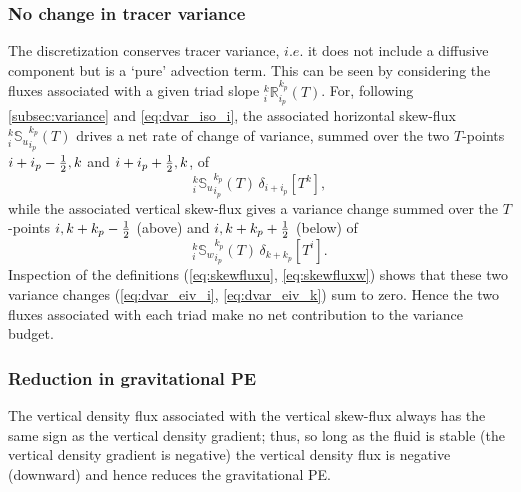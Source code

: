 \documentclass[../tex_main/NEMO_manual]{subfiles}
\begin{document}
\subsubsection{No change in tracer variance}
The discretization conserves tracer variance, $i.e.$ it does not
include a diffusive component but is a `pure' advection term. This can
be seen
by considering the
fluxes associated with a given triad slope
$_i^k{\mathbb{R}}_{i_p}^{k_p} (T)$. For, following
\autoref{subsec:variance} and \autoref{eq:dvar_iso_i}, the
associated horizontal skew-flux $_i^k{\mathbb{S}_u}_{i_p}^{k_p} (T)$
drives a net rate of change of variance, summed over the two
$T$-points $i+i_p-\textstyle\frac{1}{2},k$ and $i+i_p+\textstyle\frac{1}{2},k$, of
\begin{equation}
\label{eq:dvar_eiv_i}
  _i^k{\mathbb{S}_u}_{i_p}^{k_p} (T)\,\delta_{i+ i_p}[T^k],
\end{equation}
while the associated vertical skew-flux gives a variance change summed over the
$T$-points $i,k+k_p-\textstyle\frac{1}{2}$ (above) and $i,k+k_p+\textstyle\frac{1}{2}$ (below) of
\begin{equation}
\label{eq:dvar_eiv_k}
  _i^k{\mathbb{S}_w}_{i_p}^{k_p} (T) \,\delta_{k+ k_p}[T^i].
\end{equation}
Inspection of the definitions (\autoref{eq:skewfluxu}, \autoref{eq:skewfluxw})
shows that these two variance changes (\autoref{eq:dvar_eiv_i}, \autoref{eq:dvar_eiv_k})
sum to zero. Hence the two fluxes associated with each triad make no
net contribution to the variance budget.

\subsubsection{Reduction in gravitational PE}
The vertical density flux associated with the vertical skew-flux
always has the same sign as the vertical density gradient; thus, so
long as the fluid is stable (the vertical density gradient is
negative) the vertical density flux is negative (downward) and hence
reduces the gravitational PE.
\end{document}
